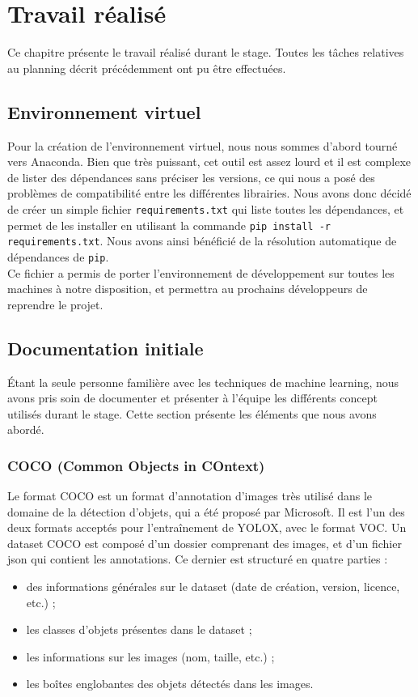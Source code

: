 \chapter{Travail réalisé}

Ce chapitre présente le travail réalisé durant le stage. Toutes les tâches relatives au planning
décrit précédemment ont pu être effectuées.

\section{Environnement virtuel}

Pour la création de l'environnement virtuel, nous nous sommes d'abord tourné vers Anaconda.
Bien que très puissant, cet outil est assez lourd et il est complexe de lister des dépendances
sans préciser les versions, ce qui nous a posé des problèmes de compatibilité entre les différentes
librairies.
Nous avons donc décidé de créer un simple fichier \texttt{requirements.txt} qui liste
toutes les dépendances, et permet de les installer en utilisant la commande
\texttt{pip install -r requirements.txt}. Nous avons ainsi bénéficié de la 
résolution automatique de dépendances de \texttt{pip}.\\

Ce fichier a permis de porter l'environnement de développement sur toutes les machines
à notre disposition, et permettra au prochains développeurs de reprendre le projet.

\section{Documentation initiale}

Étant la seule personne familière avec les techniques de machine learning, nous avons pris soin de documenter
et présenter à l'équipe les différents concept utilisés durant le stage. Cette section présente
les éléments que nous avons abordé.

\subsection{COCO (Common Objects in COntext)}

Le format COCO \cite{Lin_Maire_Belongie_Bourdev_Girshick_Hays_Perona_Ramanan_Zitnick_Dollar_2015}
est un format d'annotation d'images très utilisé dans le domaine de la détection d'objets,
qui a été proposé par Microsoft.
Il est l'un des deux formats acceptés pour l'entraînement de YOLOX, avec le format VOC.
Un dataset COCO est composé d'un dossier comprenant des images, et d'un fichier json qui contient les annotations.
Ce dernier est structuré en quatre parties :
\begin{itemize}
    \item des informations générales sur le dataset (date de création, version, licence, etc.) ;
    \item les classes d'objets présentes dans le dataset ;
    \item les informations sur les images (nom, taille, etc.) ;
    \item les boîtes englobantes des objets détectés dans les images.
\end{itemize}

